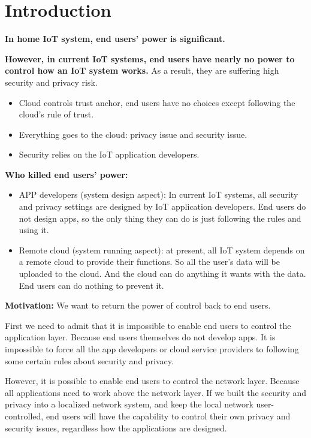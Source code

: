 \section{Introduction}
\textbf{In home IoT system, end users' power is significant.}

\textbf{However, in current IoT systems, end users have nearly no power to control how an IoT system works.} 
As a result, they are suffering high security and privacy risk.
\begin{itemize}
	\item Cloud controls trust anchor, end users have no choices except following the cloud's rule of trust. 
	\item Everything goes to the cloud: privacy issue and security issue.
	\item Security relies on the IoT application developers.
\end{itemize}

\textbf{Who killed end users' power: }
\begin{itemize}
	\item APP developers (system design aspect): In current IoT systems, all security and privacy settings are designed by IoT application developers. End users do not design apps, so the only thing they can do is just following the rules and using it.
	\item Remote cloud (system running aspect): at present, all IoT system depends on a remote cloud to provide their functions. So all the user's data will be uploaded to the cloud. And the cloud can do anything it wants with the data. End users can do nothing to prevent it.
\end{itemize}

\textbf{Motivation:} We want to return the power of control back to end users.

First we need to admit that it is impossible to enable end users to control the application layer. Because end users themselves do not develop apps. It is impossible to force all the app developers or cloud service providers to following some certain rules about security and privacy.

However, it is possible to enable end users to control the network layer. Because all applications need to work above the network layer. If we built the security and privacy into a localized network system, and keep the local network user-controlled, end users will have the capability to control their own privacy and security issues, regardless how the applications are designed.

